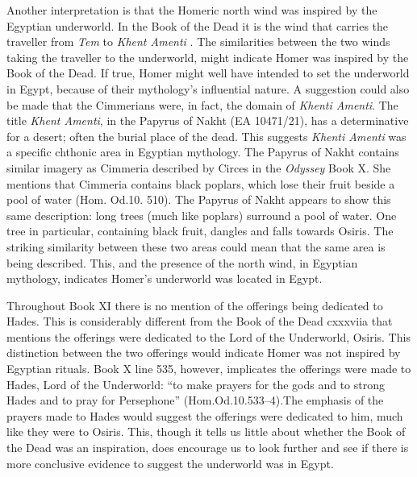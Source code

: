 	Another interpretation is that the Homeric north wind was inspired by the Egyptian underworld. In the Book of the Dead it is the wind that carries the traveller from \emph{Tem} to \emph{Khent Amenti} \parencite[300]{Budge1969}. The similarities between the two winds taking the traveller to the underworld, might indicate Homer was inspired by the Book of the Dead. If true, Homer might well have intended to set the underworld in Egypt, because of their mythology’s influential nature. A suggestion could also be made that the Cimmerians were, in fact, the domain of \emph{Khenti Amenti}. The title \emph{Khent Amenti}, in the Papyrus of Nakht (EA 10471/21), has a determinative for a desert; often the burial place of the dead. This suggests \emph{Khenti Amenti} was a specific chthonic area in Egyptian mythology. The Papyrus of Nakht contains similar imagery as Cimmeria described by Circes in the \emph{Odyssey} Book X. She mentions that Cimmeria contains black poplars, which lose their fruit beside a pool of water (Hom. Od.10. 510). The Papyrus of Nakht appears to show this same description: long trees (much like poplars) surround a pool of water. One tree in particular, containing black fruit, dangles and falls towards Osiris. The striking similarity between these two areas could mean that the same area is being described. This, and the presence of the north wind, in Egyptian mythology, indicates Homer’s underworld was located in Egypt.
	
	Throughout Book XI there is no mention of the offerings being dedicated to Hades. This is considerably different from the Book of the Dead cxxxviia that mentions the offerings were dedicated to the Lord of the Underworld, Osiris. This distinction between the two offerings would indicate Homer was not inspired by Egyptian rituals. Book X line 535, however, implicates the offerings were made to Hades, Lord of the Underworld: “to make prayers for the gods and to strong Hades and to pray for Persephone” (Hom.Od.10.533–4).The emphasis of the prayers made to Hades would suggest the offerings were dedicated to him, much like they were to Osiris. This, though it tells us little about whether the Book of the Dead was an inspiration, does encourage us to look further and see if there is more conclusive evidence to suggest the underworld was in Egypt.
	
